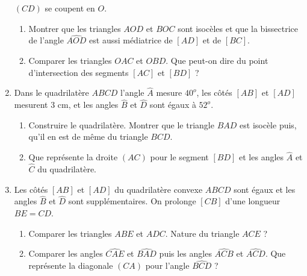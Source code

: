 \begin{enumerate}
$(CD)$ se coupent en $O$. 
\begin{enumerate}
\item Montrer que les triangles $AOD$ et $BOC$ sont isocèles et que la bissectrice de l'angle $\widehat{AOD}$ est aussi médiatrice de $[AD]$ et de $[BC]$.
\item Comparer les triangles $OAC$ et $OBD$. Que peut-on dire du point d'intersection
des segments $[AC]$ et $[BD]$ ? 
\end{enumerate}
\item Dans le quadrilatère $ABCD$ l'angle $\widehat{A}$ mesure $40^o$, les côtés $[AB]$ et $[AD]$ mesurent $3$ cm, et les angles $\widehat{B}$ et $\widehat{D}$ sont égaux à $52^o$. \begin{enumerate}
\item Construire le quadrilatère. Montrer que le triangle $BAD$ est isocèle puis, qu'il en est de même du triangle $BCD$.
\item Que représente la droite $(AC)$ pour le segment $[BD]$ et les angles $\widehat{A}$ et $\widehat{C}$ du quadrilatère. 
\end{enumerate}
\item Les côtés $[AB]$ et $[AD]$ du quadrilatère convexe $ABCD$ sont égaux et les angles $\widehat{B}$ et $\widehat{D}$ sont supplémentaires. On prolonge $[CB]$ d'une
longueur $BE=CD$. \begin{enumerate}
\item Comparer les triangles $ABE$ et $ADC$. Nature du triangle $ACE$ ? 
\item Comparer les angles $\widehat{CAE}$ et $\widehat{BAD}$ puis les angles $\widehat{ACB}$ et $\widehat{ACD}$. Que représente la diagonale $(CA)$ pour l'angle 
$\widehat{BCD}$ ? 
\end{enumerate}
\end{enumerate}